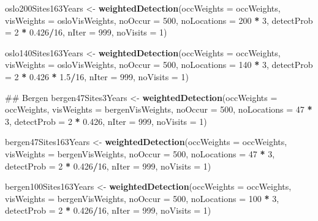 \documentclass[]{article}
\newenvironment{Shaded}{\begin{snugshade}}{\end{snugshade}}
\newcommand{\KeywordTok}[1]{\textcolor[rgb]{0.13,0.29,0.53}{\textbf{#1}}}
\newcommand{\DataTypeTok}[1]{\textcolor[rgb]{0.13,0.29,0.53}{#1}}
\newcommand{\DecValTok}[1]{\textcolor[rgb]{0.00,0.00,0.81}{#1}}
\newcommand{\FloatTok}[1]{\textcolor[rgb]{0.00,0.00,0.81}{#1}}
\newcommand{\StringTok}[1]{\textcolor[rgb]{0.31,0.60,0.02}{#1}}
\newcommand{\OperatorTok}[1]{\textcolor[rgb]{0.81,0.36,0.00}{\textbf{#1}}}
\newcommand{\NormalTok}[1]{#1}
\begin{document}
\begin{Shaded}
\begin{Highlighting}[]
\NormalTok{oslo200Sites163Years <-}\StringTok{ }\KeywordTok{weightedDetection}\NormalTok{(}\DataTypeTok{occWeights =}\NormalTok{ occWeights, }\DataTypeTok{visWeights =}\NormalTok{ osloVisWeights, }
    \DataTypeTok{noOccur =} \DecValTok{500}\NormalTok{, }\DataTypeTok{noLocations =} \DecValTok{200} \OperatorTok{*}\StringTok{ }\DecValTok{3}\NormalTok{, }\DataTypeTok{detectProb =} \DecValTok{2} \OperatorTok{*}\StringTok{ }\FloatTok{0.426}\OperatorTok{/}\DecValTok{16}\NormalTok{, }\DataTypeTok{nIter =} \DecValTok{999}\NormalTok{, }
    \DataTypeTok{noVisits =} \DecValTok{1}\NormalTok{)}

\NormalTok{oslo140Sites163Years <-}\StringTok{ }\KeywordTok{weightedDetection}\NormalTok{(}\DataTypeTok{occWeights =}\NormalTok{ occWeights, }\DataTypeTok{visWeights =}\NormalTok{ osloVisWeights, }
    \DataTypeTok{noOccur =} \DecValTok{500}\NormalTok{, }\DataTypeTok{noLocations =} \DecValTok{140} \OperatorTok{*}\StringTok{ }\DecValTok{3}\NormalTok{, }\DataTypeTok{detectProb =} \DecValTok{2} \OperatorTok{*}\StringTok{ }\FloatTok{0.426} \OperatorTok{*}\StringTok{ }\FloatTok{1.5}\OperatorTok{/}\DecValTok{16}\NormalTok{, }\DataTypeTok{nIter =} \DecValTok{999}\NormalTok{, }
    \DataTypeTok{noVisits =} \DecValTok{1}\NormalTok{)}

\NormalTok{## Bergen}
\NormalTok{bergen47Sites3Years <-}\StringTok{ }\KeywordTok{weightedDetection}\NormalTok{(}\DataTypeTok{occWeights =}\NormalTok{ occWeights, }\DataTypeTok{visWeights =}\NormalTok{ bergenVisWeights, }
    \DataTypeTok{noOccur =} \DecValTok{500}\NormalTok{, }\DataTypeTok{noLocations =} \DecValTok{47} \OperatorTok{*}\StringTok{ }\DecValTok{3}\NormalTok{, }\DataTypeTok{detectProb =} \DecValTok{2} \OperatorTok{*}\StringTok{ }\FloatTok{0.426}\NormalTok{, }\DataTypeTok{nIter =} \DecValTok{999}\NormalTok{, }
    \DataTypeTok{noVisits =} \DecValTok{1}\NormalTok{)}

\NormalTok{bergen47Sites163Years <-}\StringTok{ }\KeywordTok{weightedDetection}\NormalTok{(}\DataTypeTok{occWeights =}\NormalTok{ occWeights, }\DataTypeTok{visWeights =}\NormalTok{ bergenVisWeights, }
    \DataTypeTok{noOccur =} \DecValTok{500}\NormalTok{, }\DataTypeTok{noLocations =} \DecValTok{47} \OperatorTok{*}\StringTok{ }\DecValTok{3}\NormalTok{, }\DataTypeTok{detectProb =} \DecValTok{2} \OperatorTok{*}\StringTok{ }\FloatTok{0.426}\OperatorTok{/}\DecValTok{16}\NormalTok{, }\DataTypeTok{nIter =} \DecValTok{999}\NormalTok{, }
    \DataTypeTok{noVisits =} \DecValTok{1}\NormalTok{)}

\NormalTok{bergen100Sites163Years <-}\StringTok{ }\KeywordTok{weightedDetection}\NormalTok{(}\DataTypeTok{occWeights =}\NormalTok{ occWeights, }\DataTypeTok{visWeights =}\NormalTok{ bergenVisWeights, }
    \DataTypeTok{noOccur =} \DecValTok{500}\NormalTok{, }\DataTypeTok{noLocations =} \DecValTok{100} \OperatorTok{*}\StringTok{ }\DecValTok{3}\NormalTok{, }\DataTypeTok{detectProb =} \DecValTok{2} \OperatorTok{*}\StringTok{ }\FloatTok{0.426}\OperatorTok{/}\DecValTok{16}\NormalTok{, }\DataTypeTok{nIter =} \DecValTok{999}\NormalTok{, }
    \DataTypeTok{noVisits =} \DecValTok{1}\NormalTok{)}



\end{Highlighting}
\end{Shaded}
\end{document}
